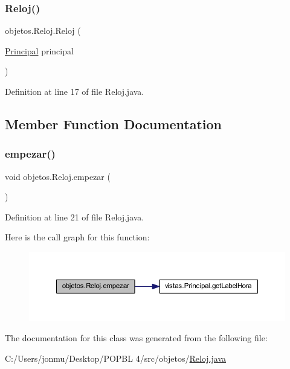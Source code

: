 \subsubsection{\texorpdfstring{Reloj()}{Reloj()}}
{\footnotesize\ttfamily objetos.\+Reloj.\+Reloj (\begin{DoxyParamCaption}\item[{\mbox{\hyperlink{classvistas_1_1_principal}{Principal}}}]{principal }\end{DoxyParamCaption})}



Definition at line 17 of file Reloj.\+java.



\subsection{Member Function Documentation}
\mbox{\label{classobjetos_1_1_reloj_a8568b99d4457c01294d2078b033330a4}} 
\subsubsection{\texorpdfstring{empezar()}{empezar()}}
{\footnotesize\ttfamily void objetos.\+Reloj.\+empezar (\begin{DoxyParamCaption}{ }\end{DoxyParamCaption})}



Definition at line 21 of file Reloj.\+java.

Here is the call graph for this function\+:
\nopagebreak
\begin{figure}[H]
\begin{center}
\leavevmode
\includegraphics[width=350pt]{classobjetos_1_1_reloj_a8568b99d4457c01294d2078b033330a4_cgraph}
\end{center}
\end{figure}


The documentation for this class was generated from the following file\+:\begin{DoxyCompactItemize}
\item 
C\+:/\+Users/jonmu/\+Desktop/\+P\+O\+P\+B\+L 4/src/objetos/\mbox{\hyperlink{_reloj_8java}{Reloj.\+java}}\end{DoxyCompactItemize}
